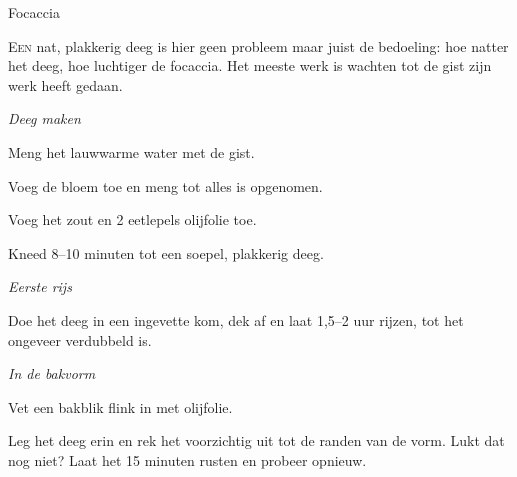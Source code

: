 \begin{recipe}{Focaccia}
\label{recipe:focaccia}


\lettrine{E}{en} nat, plakkerig deeg is hier geen probleem maar juist de
bedoeling: hoe natter het deeg, hoe luchtiger de focaccia. Het meeste werk is
wachten tot de gist zijn werk heeft gedaan.

\begin{ingredients}
\end{ingredients}


\medskip
\noindent\textit{Deeg maken}
\begin{steps}
  \item Meng het lauwwarme water met de gist.
  \item Voeg de bloem toe en meng tot alles is opgenomen.
  \item Voeg het zout en 2 eetlepels olijfolie toe.
  \item Kneed 8–10 minuten tot een soepel, plakkerig deeg.
\end{steps}

\medskip
\noindent\textit{Eerste rijs}
\begin{steps}
  \item Doe het deeg in een ingevette kom, dek af en laat 1,5–2 uur rijzen,
        tot het ongeveer verdubbeld is.
\end{steps}

\medskip
\noindent\textit{In de bakvorm}
\begin{steps}
  \item Vet een bakblik flink in met olijfolie.
  \item Leg het deeg erin en rek het voorzichtig uit tot de randen van de
        vorm. Lukt dat nog niet? Laat het 15 minuten rusten en probeer
        opnieuw.
\end{steps}


\end{recipe}
